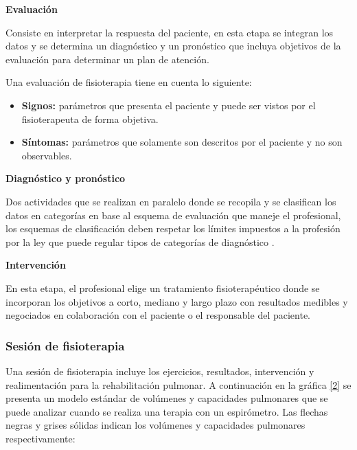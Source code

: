 \documentclass[12pt]{article}
\begin{document}
\textbf{Evaluación}

Consiste en interpretar la respuesta del paciente, en esta etapa se integran los datos y se determina un diagnóstico y un pronóstico que incluya objetivos de la evaluación para determinar un plan de atención.

Una evaluación de fisioterapia tiene en cuenta lo siguiente:

\begin{itemize}
    \item \textbf{Signos:} parámetros que presenta el paciente y puede ser vistos por el fisioterapeuta de forma objetiva.
    \item \textbf{Síntomas:} parámetros que solamente son descritos por el paciente y no son observables. 
\end{itemize}


\textbf{Diagnóstico y pronóstico}

Dos actividades que se realizan en paralelo donde se recopila y se clasifican los datos en categorías en base al esquema de evaluación que maneje el profesional, los esquemas de clasificación deben respetar los límites impuestos a la profesión por la ley que puede regular tipos de categorías de diagnóstico \cite{5}.


\textbf{Intervención}

En esta etapa, el profesional elige un tratamiento fisioterapéutico donde se incorporan los objetivos a corto, mediano y largo plazo con resultados medibles y negociados en colaboración con el paciente o el responsable del paciente\cite{27}. 


\subsubsection{Sesión de fisioterapia}

Una sesión de fisioterapia incluye los ejercicios, resultados, intervención y realimentación para la rehabilitación pulmonar. A continuación en la gráfica \ref{2} se presenta un modelo estándar de  volúmenes y capacidades pulmonares que se puede analizar cuando se realiza una terapia con un espirómetro. Las flechas negras y grises sólidas indican los volúmenes y capacidades pulmonares respectivamente:





\end{document}

